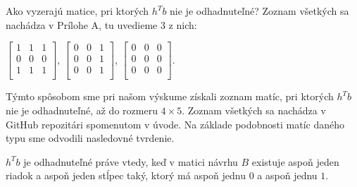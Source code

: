 Ako vyzerajú matice, pri ktorých $h^T b$ nie je odhadnuteľné? Zoznam všetkých sa nachádza v Prílohe A, tu uvedieme $3$ z nich:

\begin{center}
$
\begin{bmatrix}
1 & 1 & 1 \\
0 & 0 & 0 \\
1 & 1 & 1 \\
\end{bmatrix}
$, 
$
\begin{bmatrix}
0 & 0 & 1 \\
0 & 0 & 1 \\
0 & 0 & 1 \\
\end{bmatrix}
$, 
$
\begin{bmatrix}
0 & 0 & 0 \\
0 & 0 & 0 \\
0 & 0 & 0 \\
\end{bmatrix}
$.
\end{center}

Týmto spôsobom sme pri našom výskume získali zoznam matíc, pri ktorých $h^T b$ nie je odhadnuteľné, až do rozmeru $4 \times 5$.
Zoznam všetkých sa nachádza v GitHub repozitári spomenutom v úvode. 
Na základe podobnosti matíc daného typu sme odvodili nasledovné tvrdenie.

\begin{prop}
\label{statement 1}
$h^T b$ je odhadnuteľné práve vtedy, keď v matici návrhu $B$ existuje aspoň jeden riadok a aspoň jeden stĺpec taký,
ktorý má aspoň jednu $0$ a aspoň jednu $1$.
\end{prop}

